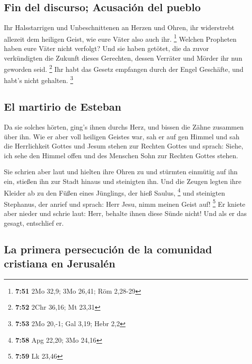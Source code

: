 \hypertarget{fin-del-discurso-acusaciuxf3n-del-pueblo}{%
\subsection{Fin del discurso; Acusación del
pueblo}\label{fin-del-discurso-acusaciuxf3n-del-pueblo}}

 Ihr Halsstarrigen und Unbeschnittenen an Herzen und
Ohren, ihr widerstrebt allezeit dem heiligen Geist, wie eure Väter also
auch ihr. \footnote{\textbf{7:51} 2Mo 32,9; 3Mo 26,41; Röm 2,28-29}
 Welchen Propheten haben eure Väter nicht verfolgt? Und
sie haben getötet, die da zuvor verkündigten die Zukunft dieses
Gerechten, dessen Verräter und Mörder ihr nun geworden seid. \footnote{\textbf{7:52}
  2Chr 36,16; Mt 23,31}  Ihr habt das Gesetz empfangen
durch der Engel Geschäfte, und habt's nicht gehalten. \footnote{\textbf{7:53}
  2Mo 20,-1; Gal 3,19; Hebr 2,2}

\hypertarget{el-martirio-de-esteban}{%
\subsection{El martirio de Esteban}\label{el-martirio-de-esteban}}

 Da sie solches hörten, ging's ihnen durchs Herz, und
bissen die Zähne zusammen über ihn.  Wie er aber voll
heiligen Geistes war, sah er auf gen Himmel und sah die Herrlichkeit
Gottes und Jesum stehen zur Rechten Gottes  und sprach:
Siehe, ich sehe den Himmel offen und des Menschen Sohn zur Rechten
Gottes stehen.

 Sie schrien aber laut und hielten ihre Ohren zu und
stürmten einmütig auf ihn ein, stießen ihn zur Stadt hinaus und
steinigten ihn.  Und die Zeugen legten ihre Kleider ab zu
den Füßen eines Jünglings, der hieß Saulus, \footnote{\textbf{7:58} Apg
  22,20; 3Mo 24,16}  und steinigten Stephanus, der anrief
und sprach: Herr Jesu, nimm meinen Geist auf! \footnote{\textbf{7:59} Lk
  23,46}  Er kniete aber nieder und schrie laut: Herr,
behalte ihnen diese Sünde nicht! Und als er das gesagt, entschlief er.

\hypertarget{la-primera-persecuciuxf3n-de-la-comunidad-cristiana-en-jerusaluxe9n}{%
\subsection{La primera persecución de la comunidad cristiana en
Jerusalén}\label{la-primera-persecuciuxf3n-de-la-comunidad-cristiana-en-jerusaluxe9n}}

